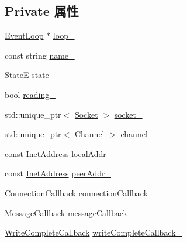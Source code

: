 \subsection*{Private 属性}
\begin{DoxyCompactItemize}
\item 
\hyperlink{classmuduo_1_1net_1_1EventLoop}{Event\+Loop} $\ast$ \hyperlink{classmuduo_1_1net_1_1TcpConnection_a19968f50018d32ac31f5cba0195591ac}{loop\+\_\+}
\item 
const string \hyperlink{classmuduo_1_1net_1_1TcpConnection_a957ab180ea6fccb9f64da8218db44728}{name\+\_\+}
\item 
\hyperlink{classmuduo_1_1net_1_1TcpConnection_a8cf72f776f4277c8138a1beaf5185325}{StateE} \hyperlink{classmuduo_1_1net_1_1TcpConnection_a4cfda1cf6d6cc44073a58722892cca7d}{state\+\_\+}
\item 
bool \hyperlink{classmuduo_1_1net_1_1TcpConnection_a1b4a188052329d2e29817977476a7e17}{reading\+\_\+}
\item 
std\+::unique\+\_\+ptr$<$ \hyperlink{classmuduo_1_1Socket}{Socket} $>$ \hyperlink{classmuduo_1_1net_1_1TcpConnection_a70a8d655d9dbcef5b77137fc3fb5a175}{socket\+\_\+}
\item 
std\+::unique\+\_\+ptr$<$ \hyperlink{classmuduo_1_1net_1_1Channel}{Channel} $>$ \hyperlink{classmuduo_1_1net_1_1TcpConnection_a633bc86acce0a144116c7d4002e256e2}{channel\+\_\+}
\item 
const \hyperlink{classmuduo_1_1net_1_1InetAddress}{Inet\+Address} \hyperlink{classmuduo_1_1net_1_1TcpConnection_a88a239b30ae68b6ad7f7abeb25776b1e}{local\+Addr\+\_\+}
\item 
const \hyperlink{classmuduo_1_1net_1_1InetAddress}{Inet\+Address} \hyperlink{classmuduo_1_1net_1_1TcpConnection_af10cc5d13ba24f9bbd98242c330bd50b}{peer\+Addr\+\_\+}
\item 
\hyperlink{namespacemuduo_1_1net_a78754792e997a13cb10908eb7ec508b2}{Connection\+Callback} \hyperlink{classmuduo_1_1net_1_1TcpConnection_ae4ac7fea1abbcfb56d481dbe8ffb37e7}{connection\+Callback\+\_\+}
\item 
\hyperlink{namespacemuduo_1_1net_acaa802028467a41738aeb49699e85285}{Message\+Callback} \hyperlink{classmuduo_1_1net_1_1TcpConnection_aa4d5ea21d215329779698e634e5e7755}{message\+Callback\+\_\+}
\item 
\hyperlink{namespacemuduo_1_1net_a525c3730bfefb763975b035ebc88a63d}{Write\+Complete\+Callback} \hyperlink{classmuduo_1_1net_1_1TcpConnection_a525f0d11cfa2e271600caa30407b6150}{write\+Complete\+Callback\+\_\+}
\item 

\end{DoxyCompactItemize}
